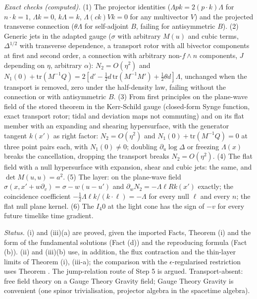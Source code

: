 \emph{Exact checks (computed).} (1) The projector identities ($\Lambda pk = 2(p\cdot k)\Lambda$ for $n\cdot k = 1$, $\Lambda k = 0$, $k\Lambda = k$, $\Lambda(ck)Vk = 0$ for any multivector $V$) and the projected transverse connection ($\theta\Lambda$ for self-adjoint $B$, failing for antisymmetric $B$). (2) Generic jets in the adapted gauge ($\sigma$ with arbitrary $M(u)$ and cubic terms, $\Delta^{1/2}$ with transverse dependence, a transport rotor with all bivector components at first and second order, a connection with arbitrary non-$f\wedge n$ components, $J$ depending on $\eta$, arbitrary $\alpha$): $N_{2} = O(\eta^{2})$ and $N_{1}(0) + \mathrm{tr}(M^{-1}Q) = 2[d' - \tfrac12 d\,\mathrm{tr}(M^{-1}M') + \tfrac12\theta d]\Lambda$, unchanged when the transport is removed, zero under the half-density law, failing without the connection or with antisymmetric $B$. (3) From first principles on the plane-wave field of the stored theorem in the Kerr-Schild gauge (closed-form Synge function, exact transport rotor; tidal and deviation maps not commuting) and on its flat member with an expanding and shearing hypersurface, with the generator tangent $k(x')$ as right factor: $N_{2} = O(\eta^{2})$ and $N_{1}(0) + \mathrm{tr}(M^{-1}Q) = 0$ at three point pairs each, with $N_{1}(0) \neq 0$; doubling $\partial_{u}\log\Delta$ or freezing $\Lambda(x)$ breaks the cancellation, dropping the transport breaks $N_{2} = O(\eta^{2})$. (4) The flat field with a null hypersurface with expansion, shear and cubic jets: the same, and $\det M(u, u) = a^{2}$. (5) The layer: on the plane-wave field $\sigma(x, x' + w\partial_{v}) = \sigma - w(u - u')$ and $\partial_{w}N_{2} = -\Lambda\ell Rk(x')$ exactly; the coincidence coefficient $-\tfrac12\Lambda\ell k/(k\cdot\ell) = -\Lambda$ for every null $\ell$ and every $n$; the flat null plane kernel. (6) The $I_{4}0$ at the light cone has the sign of $-v$ for every future timelike time gradient.

\emph{Status.} (i) and (iii)(a) are proved, given the imported Facts, Theorem (i) and the form of the fundamental solutions (Fact (d)) and the reproducing formula (Fact (b)). (ii) and (iii)(b) use, in addition, the flux contraction and the thin-layer limits of Theorem (i), (iii-a); the comparison with the $\epsilon$-regularised restriction uses Theorem . The jump-relation route of Step 5 is argued. Transport-absent: free field theory on a Gauge Theory Gravity field; Gauge Theory Gravity is convenient (one spinor trivialisation, projector algebra in the spacetime algebra).

